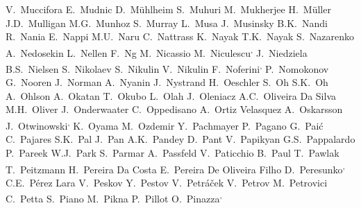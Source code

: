 \begin{flushleft}
V.~Muccifora\And
E.~Mudnic\And
D.~M{\"u}hlheim\And
S.~Muhuri\And
M.~Mukherjee\And
H.~M\"{u}ller\And
J.D.~Mulligan\And
M.G.~Munhoz\And
S.~Murray\And
L.~Musa\And
J.~Musinsky\And
B.K.~Nandi\And
R.~Nania\And
E.~Nappi\And
M.U.~Naru\And
C.~Nattrass\And
K.~Nayak\And
T.K.~Nayak\And
S.~Nazarenko\And
A.~Nedosekin\And
L.~Nellen\And
F.~Ng\And
M.~Nicassio\And
M.~Niculescu\textsuperscript{,}\And
J.~Niedziela\And
B.S.~Nielsen\And
S.~Nikolaev\And
S.~Nikulin\And
V.~Nikulin\And
F.~Noferini\textsuperscript{,}\And
P.~Nomokonov\And
G.~Nooren\And
J.~Norman\And
A.~Nyanin\And
J.~Nystrand\And
H.~Oeschler\And
S.~Oh\And
S.K.~Oh\And
A.~Ohlson\And
A.~Okatan\And
T.~Okubo\And
L.~Olah\And
J.~Oleniacz\And
A.C.~Oliveira Da Silva\And
M.H.~Oliver\And
J.~Onderwaater\And
C.~Oppedisano\And
A.~Ortiz Velasquez\And
A.~Oskarsson\And
J.~Otwinowski\textsuperscript{,}\And
K.~Oyama\And
M.~Ozdemir\And
Y.~Pachmayer\And
P.~Pagano\And
G.~Pai\'{c}\And
C.~Pajares\And
S.K.~Pal\And
J.~Pan\And
A.K.~Pandey\And
D.~Pant\And
V.~Papikyan\And
G.S.~Pappalardo\And
P.~Pareek\And
W.J.~Park\And
S.~Parmar\And
A.~Passfeld\And
V.~Paticchio\And
B.~Paul\And
T.~Pawlak\And
T.~Peitzmann\And
H.~Pereira Da Costa\And
E.~Pereira De Oliveira Filho\And
D.~Peresunko\textsuperscript{,}\And
C.E.~P\'erez Lara\And
V.~Peskov\And
Y.~Pestov\And
V.~Petr\'{a}\v{c}ek\And
V.~Petrov\And
M.~Petrovici\And
C.~Petta\And
S.~Piano\And
M.~Pikna\And
P.~Pillot\And
O.~Pinazza\textsuperscript{,}\And

\end{flushleft}
